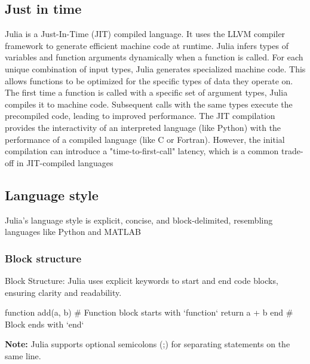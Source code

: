 \documentclass{report}
\begin{document}
     \subsection{Just in time}
     \bigbreak \noindent 
     Julia is a Just-In-Time (JIT) compiled language. It uses the LLVM compiler framework to generate efficient machine code at runtime.
     \bigbreak \noindent 
     Julia infers types of variables and function arguments dynamically when a function is called.
     \bigbreak \noindent 
     For each unique combination of input types, Julia generates specialized machine code. This allows functions to be optimized for the specific types of data they operate on.
     \bigbreak \noindent 
     The first time a function is called with a specific set of argument types, Julia compiles it to machine code. Subsequent calls with the same types execute the precompiled code, leading to improved performance.
     \bigbreak \noindent 
     The JIT compilation provides the interactivity of an interpreted language (like Python) with the performance of a compiled language (like C or Fortran).
     \bigbreak \noindent 
    However, the initial compilation can introduce a "time-to-first-call" latency, which is a common trade-off in JIT-compiled languages

    \bigbreak \noindent 
    \subsection{Language style}
    \bigbreak \noindent 
    Julia's language style is explicit, concise, and block-delimited, resembling languages like Python and MATLAB
    \bigbreak \noindent 
    \subsubsection{Block structure}
    \bigbreak \noindent 
    Block Structure: Julia uses explicit keywords to start and end code blocks, ensuring clarity and readability.
    \bigbreak \noindent 
    \begin{jlcode}
        function add(a, b)  # Function block starts with `function`
            return a + b
        end                 # Block ends with `end`
    \end{jlcode}
    \bigbreak \noindent 
    \textbf{Note:} Julia supports optional semicolons (;) for separating statements on the same line. 
    \bigbreak \noindent 

    \bigbreak \noindent 
\end{document}
